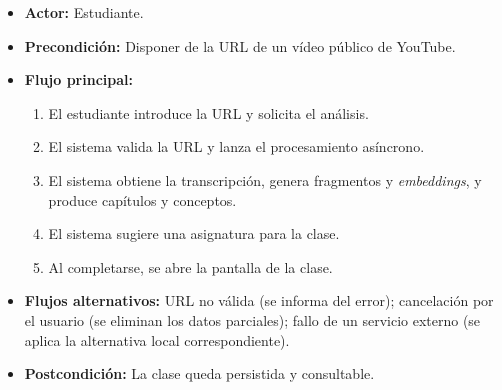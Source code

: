 \begin{itemize}
  \item \textbf{Actor:} Estudiante.
  \item \textbf{Precondición:} Disponer de la URL de un vídeo público de YouTube.
  \item \textbf{Flujo principal:}
    \begin{enumerate}
      \item El estudiante introduce la URL y solicita el análisis.
      \item El sistema valida la URL y lanza el procesamiento asíncrono.
      \item El sistema obtiene la transcripción, genera fragmentos y \textit{embeddings}, y produce
            capítulos y conceptos.
      \item El sistema sugiere una asignatura para la clase.
      \item Al completarse, se abre la pantalla de la clase.
    \end{enumerate}
  \item \textbf{Flujos alternativos:} URL no válida (se informa del error); cancelación por el
        usuario (se eliminan los datos parciales); fallo de un servicio externo (se aplica la
        alternativa local correspondiente).
  \item \textbf{Postcondición:} La clase queda persistida y consultable.
\end{itemize}
